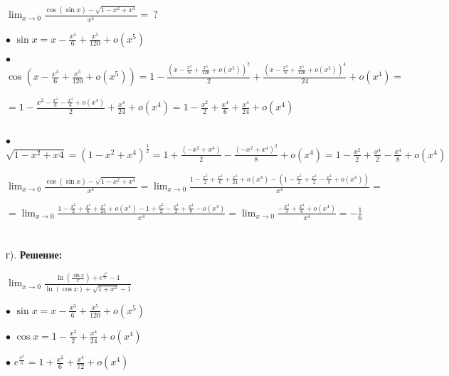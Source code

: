 \documentclass[a4paper, 12pt]{article}
\begin{document}
    \par $\lim_{x \to 0} \frac{\cos{(\sin{x})} - \sqrt{1 - x^2 + x^4}}{x^4} = \ ?$
    \\
    \par $\bullet$ $\sin{x} = x - \frac{x^3}{6} + \frac{x^5}{120} + o(x^5)$
    \\
    \par $\bullet$ $\cos{\left(x - \frac{x^3}{6} + \frac{x^5}{120} + o(x^5)\right)} = 1 - \frac{\left(x - \frac{x^3}{6} + \frac{x^5}{120} + o(x^5)\right)^2}{2} + \frac{\left(x - \frac{x^3}{6} + \frac{x^5}{120} + o(x^5)\right)^4}{24} + o(x^4) = $ \par $ = 1 - \frac{x^2 - \frac{x^4}{6} - \frac{x^4}{6} + o(x^4)}{2} + \frac{x^4}{24} + o(x^4) = 1 - \frac{x^2}{2} + \frac{x^4}{6} + \frac{x^4}{24} + o(x^4)$
    \\
    \\
    \par $\bullet$ $\sqrt{1 - x^2 + x4} = (1 - x^2 + x^4)^{\frac{1}{2}} = 1 + \frac{(- x^2 + x^4)}{2} - \frac{(- x^2 + x^4)^2}{8} + o(x^4) = 1 - \frac{x^2}{2} + \frac{x^4}{2} - \frac{x^4}{8} + o(x^4)$
    \\
    \par $\lim_{x \to 0} \frac{\cos{(\sin{x})} - \sqrt{1 - x^2 + x^4}}{x^4} = \lim_{x \to 0} \frac{1 - \frac{x^2}{2} + \frac{x^4}{6} + \frac{x^4}{24} + o(x^4) - \left(1 - \frac{x^2}{2} + \frac{x^4}{2} - \frac{x^4}{8} + o(x^4)\right)}{x^4} = $\par$ = \lim_{x \to 0} \frac{1 - \frac{x^2}{2} + \frac{x^4}{6} + \frac{x^4}{24} + o(x^4) - 1 + \frac{x^2}{2} - \frac{x^4}{2} + \frac{x^4}{8} - o(x^4)}{x^4} = \lim_{x \to 0} \frac{-\frac{x^4}{3} + \frac{x^4}{6} + o(x^4)}{x^4} = -\frac{1}{6}$ 
    \\
    \\
    \\ г).   \textbf{Решение: }
    \par $\lim_{x \to 0} \frac{\ln{(\frac{\sin{x}}{x}) +e^{\frac{x^2}{6}} - 1}}{\ln{(\cos{x})} + \sqrt{1 + x^2} - 1}$
    \\
    \par $\bullet$ $\sin{x} = x - \frac{x^3}{6} + \frac{x^5}{120} + o(x^5)$
    \\
    \par $\bullet$ $\cos{x} = 1 - \frac{x^2}{2} + \frac{x^4}{24} + o(x^4)$
    \\
    \par $\bullet$ $e^{\frac{x^2}{6}} = 1 + \frac{x^2}{6} + \frac{x^4}{72} + o(x^4)$
    \\
\end{document}
